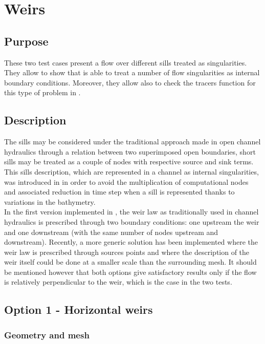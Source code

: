 \chapter{Weirs}

\section{Purpose}
These two test cases present a flow over different sills
treated as singularities. They allow to show
that  is able to treat a number of flow singularities
as internal boundary conditions. Moreover, they allow also to check
the tracers function for this type of problem in .

\section{Description}

The sills may be considered under the traditional approach made
in open channel hydraulics through a relation between two superimposed
open boundaries, short sills may be treated as a couple of nodes
with respective source and sink terms.\\

This sills description, which are represented in a channel as internal
singularities, was introduced in  in order to avoid the
multiplication of computational nodes and associated reduction in time
step when a sill is represented thanks to variations in the bathymetry.\\
In the first version implemented in , the weir law as traditionally
used in channel hydraulics is prescribed through two boundary conditions:
one upstream the weir and one downstream (with the same number of nodes
upstream and downstream).
Recently, a more generic solution has been implemented where the weir law
is prescribed through sources points and where the description of the weir
itself could be done at a smaller scale than the surrounding mesh.
It should be mentioned however that both options give satisfactory results
only if the flow is relatively perpendicular to the weir, which is
the case in the two tests.

\section{Option 1 - Horizontal weirs}

\subsection{Geometry and mesh}

